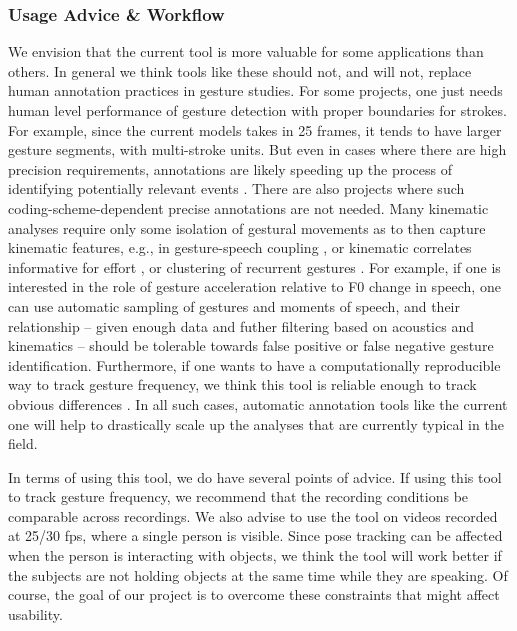 \documentclass[11pt,headings=small,cleardoublepage=empty,tocflat,numbers=noenddot,twoside,captions=tableheading]{scrbook}
\begin{document}
\begin{refsection}
\begin{table}[H]
\begin{table}[H]
\begin{table}[H]
\begin{table}[H]
\subsubsection{Usage Advice \& Workflow}
We envision that the current tool is more valuable for some applications than others. In general we think tools like these should not, and will not, replace human annotation practices in gesture studies. For some projects, one just needs human level performance of gesture detection with proper boundaries for strokes. For example, since the current models takes in 25 frames, it tends to have larger gesture segments, with multi-stroke units. But even in cases where there are high precision requirements, annotations are likely speeding up the process of identifying potentially relevant events \parencite{ripperdaSpeedingDetectionNoniconic2020}. There are also projects where such coding-scheme-dependent precise annotations are not needed. Many kinematic analyses require only some isolation of gestural movements as to then capture kinematic features, e.g., in gesture-speech coupling \parencite{wagnerGestureSpeechInteraction2014}, or kinematic correlates informative for effort \parencite{rasenbergMultimodalNatureCommunicative2022}, or clustering of recurrent gestures \parencite{mcneillCatchmentsProsodyDiscourse2001, beecksSpatiotemporalSimilaritySearch2015}. For example, if one is interested in the role of gesture acceleration relative to F0 change in speech, one can use automatic sampling of gestures and moments of speech, and their relationship -- given enough data and futher filtering based on acoustics and kinematics -- should be tolerable towards false positive or false negative gesture identification. Furthermore, if one wants to have a computationally reproducible way to track gesture frequency, we think this tool is reliable enough to track obvious differences \parencite{hogrefeActualPotentialUse2013}. In all such cases, automatic annotation tools like the current one will help to drastically scale up the analyses that are currently typical in the field.

In terms of using this tool, we do have several points of advice. If using this tool to track gesture frequency, we recommend that the recording conditions be comparable across recordings. We also advise to use the tool on videos recorded at 25/30 fps, where a single person is visible. Since pose tracking can be affected when the person is interacting with objects, we think the tool will work better if the subjects are not holding objects at the same time while they are speaking. Of course, the goal of our project is to overcome these constraints that might affect usability.


\end{table}
\end{table}
\end{table}
\end{table}
\end{refsection}
\end{document}
